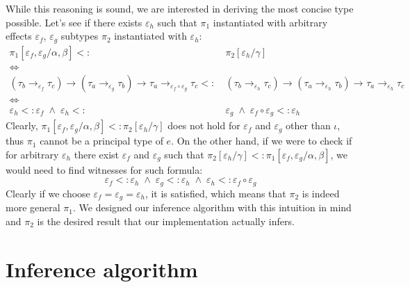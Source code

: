 \documentclass[declaration,shortabstract]{iithesis}
\newcommand{\arrow}[3]{{#1}\rightarrow_{#2}{#3}}
\begin{document}
While this reasoning is sound, we are interested in deriving the most concise type possible. Let's see if there exists $\varepsilon_h$ such that $\pi_1$ instantiated with arbitrary effects $\varepsilon_f$, $\varepsilon_g$ subtypes $\pi_2$ instantiated with $\varepsilon_h$:
\begin{align*}
    \pi_1[\varepsilon_f, \varepsilon_g / \alpha, \beta] <: & \: \pi_2 [\varepsilon_h / \gamma]
    \\ \iff \\ 
    \arrow{(\arrow{\tau_b}{\varepsilon_f}{\tau_c})}{}{
        \arrow{(\arrow{\tau_a}{\varepsilon_g}{\tau_b})}{}{
                \arrow{\tau_a}{\varepsilon_f \circ \varepsilon_g}{\tau_c}}} <: & \:
    \arrow{(\arrow{\tau_b}{\varepsilon_h}{\tau_c})}{}{
        \arrow{(\arrow{\tau_a}{\varepsilon_h}{\tau_b})}{}{
                \arrow{\tau_a}{\varepsilon_h}{\tau_c}}}
    \\ \iff \\ 
    \varepsilon_h <: \varepsilon_f          \;\wedge\; 
    \varepsilon_h <: &  \: \varepsilon_g    \;\wedge\; 
    \varepsilon_f \circ \varepsilon_g <: \varepsilon_h
\end{align*}
Clearly, $\pi_1[\varepsilon_f, \varepsilon_g / \alpha, \beta] <: \pi_2 [\varepsilon_h / \gamma]$
does not hold for $\varepsilon_f$ and $\varepsilon_g$ other than $\iota$, thus $\pi_1$ cannot be a principal type of $e$.
On the other hand, if we were to check if for arbitrary $\varepsilon_h$ there exist $\varepsilon_f$ and $\varepsilon_g$ such that
$\pi_2 [\varepsilon_h / \gamma] <: \pi_1[\varepsilon_f, \varepsilon_g / \alpha, \beta]$, we would need to find witnesses for such formula:
$$ \varepsilon_f <: \varepsilon_h          \;\wedge\; 
    \varepsilon_g <: \varepsilon_h    \;\wedge\; 
     \varepsilon_h <: \varepsilon_f \circ \varepsilon_g $$
Clearly if we choose $ \varepsilon_f = \varepsilon_g = \varepsilon_h$, it is satisfied, which means that $\pi_2$ is indeed more general $\pi_1$.
We designed our inference algorithm with this intuition in mind and $\pi_2$ is the desired result that our implementation actually infers.

\chapter{Inference algorithm}
\end{document}
